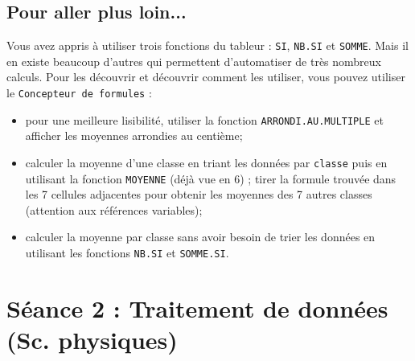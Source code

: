 \subsection*{Pour aller plus loin...}
Vous avez appris à utiliser trois fonctions du tableur : \texttt{SI}, \texttt{NB.SI} et \texttt{SOMME}. Mais il en existe beaucoup d'autres qui permettent d'automatiser de très nombreux calculs. Pour les découvrir et découvrir comment les utiliser, vous pouvez utiliser le \texttt{Concepteur de formules} :

\begin{itemize}
\item pour une meilleure lisibilité, utiliser la fonction \texttt{ARRONDI.AU.MULTIPLE} et afficher les moyennes arrondies au centième;
\item calculer la moyenne d'une classe en triant les données par \texttt{classe} puis en utilisant la fonction \texttt{MOYENNE} (déjà vue en 6) ; tirer la formule trouvée dans les 7 cellules adjacentes pour obtenir les moyennes des 7 autres classes (attention aux références variables);
\item calculer la moyenne par classe sans avoir besoin de trier les données en utilisant les fonctions \texttt{NB.SI} et \texttt{SOMME.SI}.
\end{itemize}

\vfill





%
%
%
%


\pagebreak

\section{Séance 2 : Traitement de données (Sc. physiques)}\label{ficheTableur4e2}

